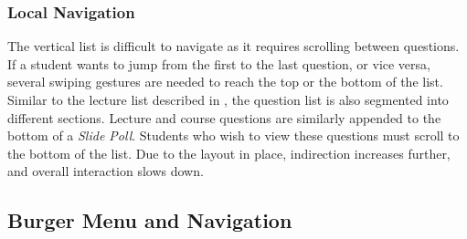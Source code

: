 \subsubsection{Local Navigation}

The vertical list is difficult to navigate as it requires scrolling between questions. If a student wants to jump from the first to the last question, or vice versa, several swiping gestures are needed to reach the top or the bottom of the list.
Similar to the lecture list described in , the question list is also segmented into different sections. Lecture and course questions are similarly appended to the bottom of a \emph{Slide Poll}. Students who wish to view these questions must scroll to the bottom of the list. Due to the layout in place, indirection increases further, and overall interaction slows down.



\subsection{Burger Menu and Navigation}
\label{section:con:problems:navigation}

